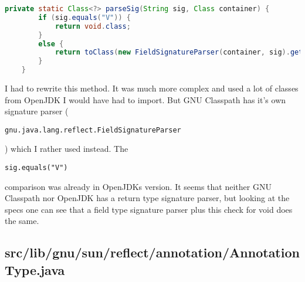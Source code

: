 \documentclass[a4paper, 10pt, titlepage]{scrartcl} %
\begin{document}
\begin{lstlisting}[language=Java,firstnumber=465]
    private static Class<?> parseSig(String sig, Class container) {
        if (sig.equals("V")) {
            return void.class;
        }
        else {
            return toClass(new FieldSignatureParser(container, sig).getFieldType());
        }
    }
\end{lstlisting}
I had to rewrite this method. It was much more complex and used a lot of
classes from OpenJDK I would have had to import. But GNU Classpath has it's own
signature parser (\begin{scriptsize}\verb|gnu|\hspace{0.0pt}\verb|.|\hspace{0.0pt}\verb|java|\hspace{0.0pt}\verb|.|\hspace{0.0pt}\verb|lang|\hspace{0.0pt}\verb|.|\hspace{0.0pt}\verb|reflect|\hspace{0.0pt}\verb|.|\hspace{0.0pt}\verb|FieldSignatureParser|\end{scriptsize}) which I
rather used instead. The \begin{scriptsize}\verb|sig|\hspace{0.0pt}\verb|.|\hspace{0.0pt}\verb|equals|\hspace{0.0pt}\verb|(|\hspace{0.0pt}\verb||\hspace{0.0pt}\verb|"|\hspace{0.0pt}\verb|V|\hspace{0.0pt}\verb|"|\hspace{0.0pt}\verb||\hspace{0.0pt}\verb|)|\hspace{0.0pt}\verb||\end{scriptsize} comparison was already in
OpenJDKs version. It seems that neither GNU Classpath nor OpenJDK has a return
type signature parser, but looking at the specs one can see that a field type
signature parser plus this check for void does the same.

\subsection{src/lib/gnu/sun/reflect/annotation/AnnotationType.java}
\label{sec:src/lib/gnu/sun/reflect/annotation/AnnotationType.java}
\end{document}
